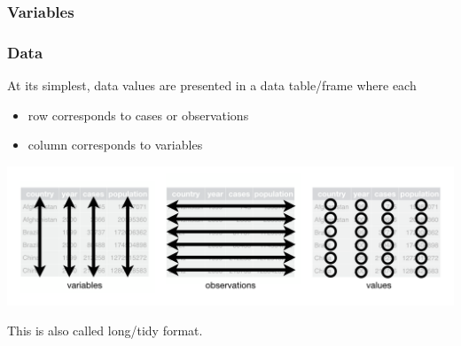 \documentclass[handout]{beamer}
\newcommand{\blue}[1]{\textcolor{blue2}{#1}}
\begin{document}
\begin{frame}[fragile]
\frametitle{Variables}

%
%
%
%
%
%
%
%
%


\end{frame}



\begin{frame}
\frametitle{Data}

At its simplest, data values are presented in a data table/frame where each
\begin{itemize}
\pause\item row corresponds to \blue{cases} or \blue{observations}
\pause\item column corresponds to \blue{variables}
\end{itemize}

\begin{center}
\pause\includegraphics[width=\linewidth]{figure/tidy} 
\end{center}

\pause This is also called \blue{long/tidy} format. 
\end{frame}
\end{document}
